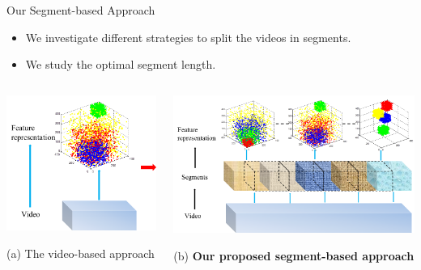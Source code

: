 \documentclass{beamer}
\begin{document}
\begin{frame}{Our Segment-based Approach} 
\begin{itemize}
	\item We investigate different strategies to split the videos in segments.
	\item We study the optimal segment length.
\end{itemize}
\begin{columns}
  \begin{column}{0.3\textwidth}
    \centerline{\includegraphics[width=1\textwidth]{images/video_based2.png}}
    (a) The video-based approach
  \end{column}

  \begin{column}{0.7\textwidth}
    \centerline{\includegraphics[width=1\textwidth]{images/segment_based.png}}
    (b) \textbf{Our proposed segment-based approach}
  \end{column}
\end{columns}
\bigskip
 
  
\end{frame}
\end{document}
